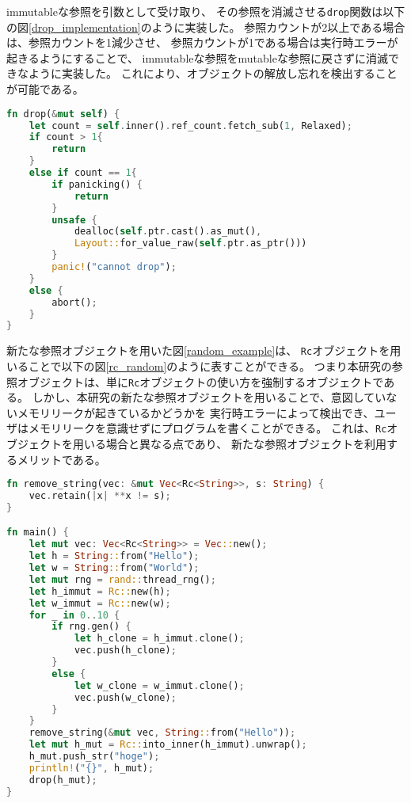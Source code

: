 \documentclass{sumiilab-paper}
\theoremstyle{mystyle}
\numberwithin{definition}{chapter} %
\begin{document}
immutableな参照を引数として受け取り、
その参照を消滅させる\texttt{drop}関数は以下の図\ref{drop_implementation}のように実装した。
参照カウントが2以上である場合は、参照カウントを1減少させ、
参照カウントが1である場合は実行時エラーが起きるようにすることで、
immutableな参照をmutableな参照に戻さずに消滅できなように実装した。
これにより、オブジェクトの解放し忘れを検出することが可能である。
\begin{lstlisting}[language=Rust, caption=関数back\_to\_mutの実装, label=drop_implementation, captionpos=b]
fn drop(&mut self) {
    let count = self.inner().ref_count.fetch_sub(1, Relaxed);
    if count > 1{
        return
    }
    else if count == 1{
        if panicking() {
            return
        }
        unsafe {
            dealloc(self.ptr.cast().as_mut(), 
            Layout::for_value_raw(self.ptr.as_ptr()))
        }
        panic!("cannot drop");
    }
    else {
        abort();
    }
}
\end{lstlisting}

新たな参照オブジェクトを用いた図\ref{random_example}は、
\texttt{Rc}オブジェクトを用いることで以下の図\ref{rc_random}のように表すことができる。
つまり本研究の参照オブジェクトは、単に\texttt{Rc}オブジェクトの使い方を強制するオブジェクトである。
しかし、本研究の新たな参照オブジェクトを用いることで、意図していないメモリリークが起きているかどうかを
実行時エラーによって検出でき、ユーザはメモリリークを意識せずにプログラムを書くことができる。
これは、\texttt{Rc}オブジェクトを用いる場合と異なる点であり、
新たな参照オブジェクトを利用するメリットである。
\begin{lstlisting}[language=Rust, caption=新たな参照オブジェクトを用いた並列処理の例, 
  label=rc_random, captionpos=b]
fn remove_string(vec: &mut Vec<Rc<String>>, s: String) {
    vec.retain(|x| **x != s);
}

fn main() {
    let mut vec: Vec<Rc<String>> = Vec::new();
    let h = String::from("Hello");
    let w = String::from("World");
    let mut rng = rand::thread_rng();
    let h_immut = Rc::new(h);
    let w_immut = Rc::new(w);
    for _ in 0..10 {
        if rng.gen() {
            let h_clone = h_immut.clone();
            vec.push(h_clone);
        }
        else {
            let w_clone = w_immut.clone();
            vec.push(w_clone);
        }
    }
    remove_string(&mut vec, String::from("Hello"));
    let mut h_mut = Rc::into_inner(h_immut).unwrap();
    h_mut.push_str("hoge");
    println!("{}", h_mut);
    drop(h_mut);
}
\end{lstlisting}
\end{document}

